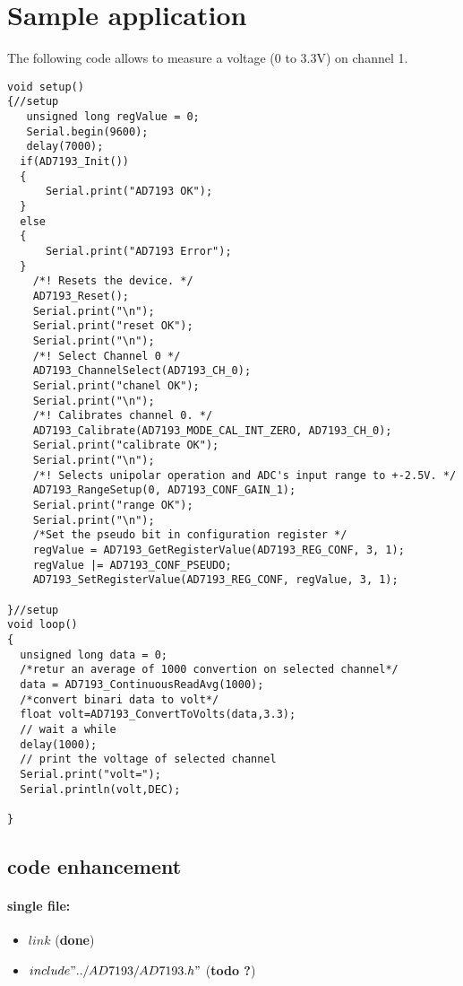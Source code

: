 \documentclass[10pt,a4paper]{report}
\begin{document}
\section{Sample application}

The following code allows to measure a voltage (0 to 3.3V) on channel 1.

\begin{lstlisting}
void setup()
{//setup
   unsigned long regValue = 0;
   Serial.begin(9600);
   delay(7000);
  if(AD7193_Init())
  {
      Serial.print("AD7193 OK");
  }
  else
  {
      Serial.print("AD7193 Error");
  }
    /*! Resets the device. */
    AD7193_Reset();
    Serial.print("\n");
    Serial.print("reset OK");
    Serial.print("\n");
    /*! Select Channel 0 */
    AD7193_ChannelSelect(AD7193_CH_0);
    Serial.print("chanel OK");
    Serial.print("\n");
    /*! Calibrates channel 0. */
    AD7193_Calibrate(AD7193_MODE_CAL_INT_ZERO, AD7193_CH_0);
    Serial.print("calibrate OK");
    Serial.print("\n");
    /*! Selects unipolar operation and ADC's input range to +-2.5V. */
    AD7193_RangeSetup(0, AD7193_CONF_GAIN_1);
    Serial.print("range OK");
    Serial.print("\n");
    /*Set the pseudo bit in configuration register */
    regValue = AD7193_GetRegisterValue(AD7193_REG_CONF, 3, 1);
    regValue |= AD7193_CONF_PSEUDO;
    AD7193_SetRegisterValue(AD7193_REG_CONF, regValue, 3, 1);
    
}//setup
void loop()
{ 
  unsigned long data = 0;
  /*retur an average of 1000 convertion on selected channel*/
  data = AD7193_ContinuousReadAvg(1000);
  /*convert binari data to volt*/
  float volt=AD7193_ConvertToVolts(data,3.3);
  // wait a while
  delay(1000);
  // print the voltage of selected channel
  Serial.print("volt=");
  Serial.println(volt,DEC);

}
\end{lstlisting}

\subsection{code enhancement}
\paragraph*{single file:}
\begin{itemize}
\item $link$ (\textbf{done})
\item $include "../AD7193/AD7193.h"$ (\textbf{todo ?})
\end{itemize}
\end{document}
